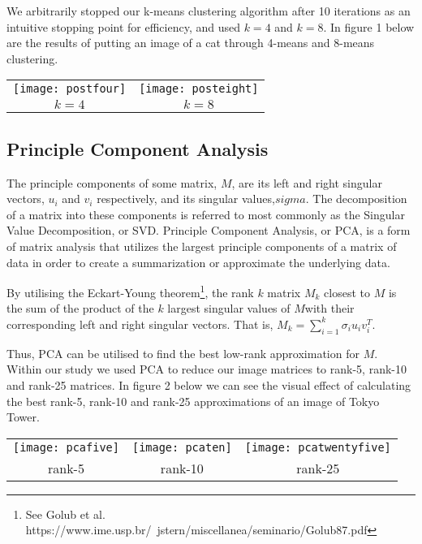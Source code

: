 We arbitrarily stopped our k-means clustering algorithm after 10 iterations as an intuitive stopping point for efficiency, and used $k=4$ and $k=8$. In figure 1 below are the results of putting an image of a cat through 4-means and 8-means
clustering.

\vspace*{3mm}
\begin{tabular}{c c}
	\texttt{[image: postfour]} &
		\texttt{[image: posteight]} \\
	$k=4$ & $k=8$ \\
\end{tabular}

\subsection{Principle Component Analysis}
The principle components of some matrix, $M$, are its left and right singular vectors, $u_i$ and $v_i$ respectively, and its singular values,$sigma$. The decomposition of a matrix into these components is referred to most commonly as the Singular Value Decomposition, or SVD.
Principle Component Analysis, or PCA, is a form of matrix analysis that utilizes the largest principle components of a matrix of data in order to create a summarization or approximate the underlying data.

By utilising the Eckart-Young theorem\footnote{See Golub et al. https://www.ime.usp.br/~jstern/miscellanea/seminario/Golub87.pdf}, the rank $k$ matrix $M_k$ closest to $M$ is the sum of the product of the $k$ largest singular values of $M$with their corresponding left and right singular vectors. That is, $M_k = \sum_{i=1}^k \sigma_i u_i v_i^T$.

Thus, PCA can be utilised to find the best low-rank approximation for $M$.
Within our study we used PCA to reduce our image matrices to rank-5, rank-10 and rank-25 matrices.
In figure 2 below we can see the visual effect of calculating the best rank-5, rank-10 and rank-25
approximations of an image of Tokyo Tower.

\vspace*{3mm}
\begin{tabular}{c c c}
	\texttt{[image: pcafive]} &
		\texttt{[image: pcaten]} &
		\texttt{[image: pcatwentyfive]} \\
	rank-5 & rank-10 & rank-25 \\
\end{tabular}

